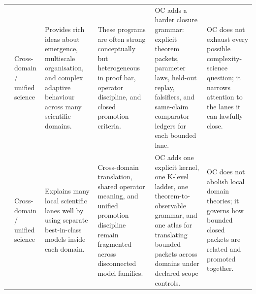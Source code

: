 \begin{longtable}{@{}L{0.17\textwidth}L{0.09\textwidth}L{0.17\textwidth}L{0.17\textwidth}L{0.20\textwidth}L{0.14\textwidth}@{}}
 & Cross-domain / unified science & Provides rich ideas about emergence, multiscale organisation, and complex adaptive behaviour across many scientific domains. & These programs are often strong conceptually but heterogeneous in proof bar, operator discipline, and closed promotion criteria. & OC adds a harder closure grammar: explicit theorem packets, parameter laws, held-out replay, falsifiers, and same-claim comparator ledgers for each bounded lane. & OC does not exhaust every possible complexity-science question; it narrows attention to the lanes it can lawfully close. \\
 & Cross-domain / unified science & Explains many local scientific lanes well by using separate best-in-class models inside each domain. & Cross-domain translation, shared operator meaning, and unified promotion discipline remain fragmented across disconnected model families. & OC adds one explicit kernel, one K-level ladder, one theorem-to-observable grammar, and one atlas for translating bounded packets across domains under declared scope controls. & OC does not abolish local domain theories; it governs how bounded closed packets are related and promoted together. \\
\bottomrule
\end{longtable}
\endgroup

